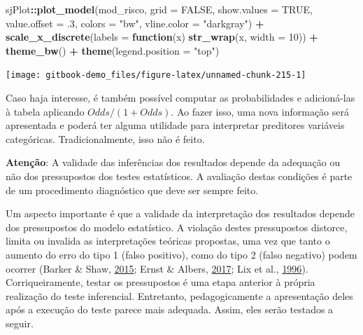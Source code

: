 \documentclass[
]{book}
\newenvironment{Shaded}{\begin{snugshade}}{\end{snugshade}}
\newcommand{\ControlFlowTok}[1]{\textcolor[rgb]{0.13,0.29,0.53}{\textbf{#1}}}
\newcommand{\DataTypeTok}[1]{\textcolor[rgb]{0.13,0.29,0.53}{#1}}
\newcommand{\DecValTok}[1]{\textcolor[rgb]{0.00,0.00,0.81}{#1}}
\newcommand{\FloatTok}[1]{\textcolor[rgb]{0.00,0.00,0.81}{#1}}
\newcommand{\KeywordTok}[1]{\textcolor[rgb]{0.13,0.29,0.53}{\textbf{#1}}}
\newcommand{\NormalTok}[1]{#1}
\newcommand{\OperatorTok}[1]{\textcolor[rgb]{0.81,0.36,0.00}{\textbf{#1}}}
\newcommand{\OtherTok}[1]{\textcolor[rgb]{0.56,0.35,0.01}{#1}}
\newcommand{\StringTok}[1]{\textcolor[rgb]{0.31,0.60,0.02}{#1}}
\begin{document}
\begin{Shaded}
\begin{Highlighting}[]
\NormalTok{sjPlot}\OperatorTok{::}\KeywordTok{plot_model}\NormalTok{(mod_risco,}
            \DataTypeTok{grid =} \OtherTok{FALSE}\NormalTok{, }
            \DataTypeTok{show.values =} \OtherTok{TRUE}\NormalTok{, }\DataTypeTok{value.offset =} \FloatTok{.3}\NormalTok{, }
            \DataTypeTok{colors =} \StringTok{"bw"}\NormalTok{,}
            \DataTypeTok{vline.color =} \StringTok{"darkgray"}\NormalTok{) }\OperatorTok{+}
\StringTok{  }\KeywordTok{scale_x_discrete}\NormalTok{(}\DataTypeTok{labels =} \ControlFlowTok{function}\NormalTok{(x) }\KeywordTok{str_wrap}\NormalTok{(x, }\DataTypeTok{width =} \DecValTok{10}\NormalTok{)) }\OperatorTok{+}
\StringTok{  }\KeywordTok{theme_bw}\NormalTok{() }\OperatorTok{+}
\StringTok{  }\KeywordTok{theme}\NormalTok{(}\DataTypeTok{legend.position =} \StringTok{"top"}\NormalTok{)}
\end{Highlighting}
\end{Shaded}

\begin{center}\texttt{[image: gitbook-demo\_files/figure-latex/unnamed-chunk-215-1]} \end{center}

Caso haja interesse, é também possível computar as probabilidades e
adicioná-las à tabela aplicando \(Odds/(1+Odds)\). Ao fazer isso, uma
nova informação será apresentada e poderá ter alguma utilidade para
interpretar preditores variáveis categóricas. Tradicionalmente, isso não
é feito.

\begin{warning}

\textbf{Atenção}: A validade das inferências dos resultados depende da
adequação ou não dos pressupostos dos testes estatísticos. A avaliação
destas condições é parte de um procedimento diagnóstico que deve ser
sempre feito.

\end{warning}

Um aspecto importante é que a validade da interpretação dos resultados
depende dos pressupostos do modelo estatístico. A violação destes
pressupostos distorce, limita ou invalida as interpretações teóricas
propostas, uma vez que tanto o aumento do erro do tipo 1 (falso
positivo), como do tipo 2 (falso negativo) podem ocorrer (Barker \&
Shaw, \protect\hyperlink{ref-Barker2015}{2015}; Ernst \& Albers,
\protect\hyperlink{ref-Ernst2017}{2017}; Lix et al.,
\protect\hyperlink{ref-Lix1996}{1996}). Corriqueiramente, testar os
pressupostos é uma etapa anterior à própria realização do teste
inferencial. Entretanto, pedagogicamente a apresentação deles após a
execução do teste parece mais adequada. Assim, eles serão testados a
seguir.
\end{document}
